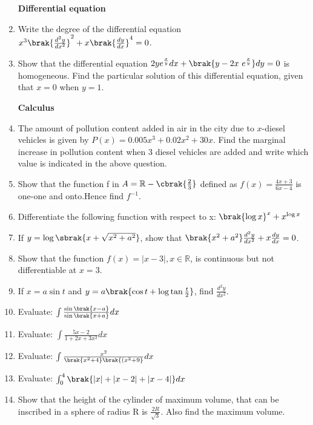 \documentclass{article}
\begin{document}
\begin{enumerate}
		\centerline{\textbf{Differential equation}}

	 \item Write the degree of the differential equation $x^3 \brak{\frac{d^2y}{dx^2}}^2+x \brak{\frac{dy}{dx}}^4=0$.

	 \item Show that the differential equation $2ye^{\frac{x}{y}}dx+\brak{y-2x~e^{\frac{x}{y}}}dy=0$ is homogeneous. Find the particular solution of this differential equation, given that $x=0$ when $y=1$.\\

		 \centerline{\textbf{Calculus}}

        \item The amount of pollution content added in air in the city due to $x$-diesel vehicles is given by $P(x)=0.005x^3+0.02x^2+30x$. Find the marginal increase in pollution content when 3 diesel vehicles are added and write which value is indicated in the above question.

	\item Show that the function f in $A=\mathbb{R}-\cbrak{\frac{2}{3}}$ defined as $f(x)=\frac{4x+3}{6x-4}$ is one-one and onto.Hence find $f^{-1}$.

	\item Differentiate the following function with respect to x: $\brak{\log x}^x+x^{\log x}$

	\item If $y=\log\sbrak{x+\sqrt{x^2+a^2}}$, show that $\brak{x^2+a^2}\frac{d^2y}{dx^2}+x\frac{dy}{dx}=0$.

	\item Show that the function $f(x)=|x-3|, x\in\mathbb{R}$, is continuous but not differentiable at $x=3$.

	\item If $x=a \sin t$ and $y=a\brak{\cos t+\log \tan\frac{t}{2}}$, find $\frac{d^2y}{dx^2}$.

	\item Evaluate: $\int \frac{\sin\brak{x-a}}{\sin\brak{x+a}} dx$

	\item Evaluate: $\int \frac{5x-2}{1+2x+3x^2} dx$

	\item Evaluate: $\int \frac{x^2}{\brak{x^2+4}\brak{(x^2+9}} dx$

	\item Evaluate: $\int_0^4 \brak{|x|+|x-2|+|x-4|} dx$

	\item Show that the height of the cylinder of maximum volume, that can be inscribed in a sphere of radius R is $\frac{2R}{\sqrt{3}}$. Also find the maximum volume.


\end{enumerate}
\end{document}
